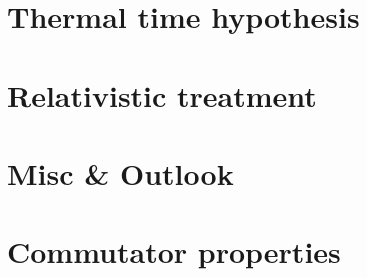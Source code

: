 \iftodo
\chapter{Thermal time hypothesis}

\fi

\iftodo
\chapter{Relativistic treatment}

\fi

\iftodo
\chapter{Misc \& Outlook}

\fi

\appendix
\chapter{Commutator properties}


\printbibliography[heading=bibintoc]


